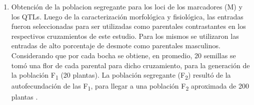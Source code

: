 \documentclass[12pt,oneside]{reedthesis}
\begin{document}
\begin{enumerate}
\def\labelenumi{\roman{enumi}.}
\item
  Obtención de la poblacion segregante para los loci de los marcadores (M) y los QTLs. Luego de la caracterización morfológica y fisiológica, las entradas fueron seleccionadas para ser utilizadas como parentales contrastantes en los respectivos cruzamientos de este estudio. Para los mismos se utilizaron las entradas de alto porcentaje de desmote como parentales masculinos. Considerando que por cada bocha se obtiene, en promedio, 20 semillas \autocite{naeem2017} se tomó una flor de cada parental para dicho cruzamiento, para la generación de la población F\textsubscript{1} (20 plantas). La población segregante (F\textsubscript{2}) resultó de la autofecundación de las F\textsubscript{1}, para llegar a una población F\textsubscript{2} aproximada de 200 plantas \autocite{bardak2018,zhang2003}.


\end{enumerate}
\end{document}
